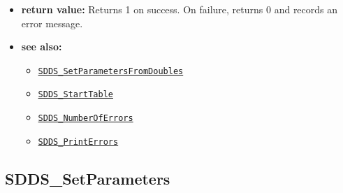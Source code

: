 \documentclass[11pt]{article}
\newcommand{\progref}[1]{\hyperref[SDDS_#1]{\tt SDDS\_#1}}
\begin{document}
\begin{itemize}
\begin{itemize}
\begin{itemize}
\end{itemize}
Note that for data of type SDDS\_STRING, pass-by-value means passing an item of type char *, while pass by reference means passing an item of type char **.
\end{itemize}
\item {\bf return value:}\newline
Returns 1 on success. On failure, returns 0 and records an error message.
\item {\bf see also:}
\begin{itemize}
\item \progref{SetParametersFromDoubles}
\item \progref{StartTable}
\item \progref{NumberOfErrors}
\item \progref{PrintErrors}
\end{itemize}
\end{itemize}

\subsection{SDDS\_SetParameters}
\label{SDDS_SetParameters}
\end{document}
